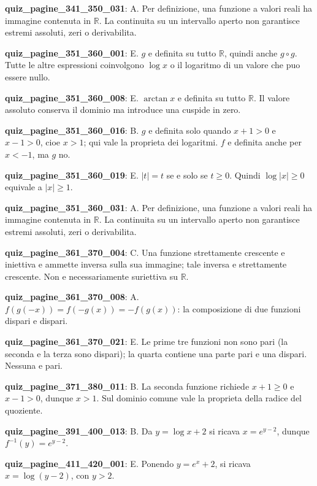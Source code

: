 \documentclass[11pt,a4paper]{article}
\newcounter{quiz}
\begin{document}
\noindent\textbf{quiz\_pagine\_341\_350\_031}: A. Per definizione, una funzione a valori reali ha immagine contenuta in $\mathbb R$. La continuita su un intervallo aperto non garantisce estremi assoluti, zeri o derivabilita.\par\medskip
\noindent\textbf{quiz\_pagine\_351\_360\_001}: E. $g$ e definita su tutto $\mathbb R$, quindi anche $g\circ g$. Tutte le altre espressioni coinvolgono $\log x$ o il logaritmo di un valore che puo essere nullo.\par\medskip
\noindent\textbf{quiz\_pagine\_351\_360\_008}: E. $\arctan x$ e definita su tutto $\mathbb R$. Il valore assoluto conserva il dominio ma introduce una cuspide in zero.\par\medskip
\noindent\textbf{quiz\_pagine\_351\_360\_016}: B. $g$ e definita solo quando $x+1>0$ e $x-1>0$, cioe $x>1$; qui vale la proprieta dei logaritmi. $f$ e definita anche per $x<-1$, ma $g$ no.\par\medskip
\noindent\textbf{quiz\_pagine\_351\_360\_019}: E. $|t|=t$ se e solo se $t\geq0$. Quindi $\log|x|\geq0$ equivale a $|x|\geq1$.\par\medskip
\noindent\textbf{quiz\_pagine\_351\_360\_031}: A. Per definizione, una funzione a valori reali ha immagine contenuta in $\mathbb R$. La continuita su un intervallo aperto non garantisce estremi assoluti, zeri o derivabilita.\par\medskip
\noindent\textbf{quiz\_pagine\_361\_370\_004}: C. Una funzione strettamente crescente e iniettiva e ammette inversa sulla sua immagine; tale inversa e strettamente crescente. Non e necessariamente suriettiva su $\mathbb R$.\par\medskip
\noindent\textbf{quiz\_pagine\_361\_370\_008}: A. $f(g(-x))=f(-g(x))=-f(g(x))$: la composizione di due funzioni dispari e dispari.\par\medskip
\noindent\textbf{quiz\_pagine\_361\_370\_021}: E. Le prime tre funzioni non sono pari (la seconda e la terza sono dispari); la quarta contiene una parte pari e una dispari. Nessuna e pari.\par\medskip
\noindent\textbf{quiz\_pagine\_371\_380\_011}: B. La seconda funzione richiede $x+1\geq0$ e $x-1>0$, dunque $x>1$. Sul dominio comune vale la proprieta della radice del quoziente.\par\medskip
\noindent\textbf{quiz\_pagine\_391\_400\_013}: B. Da $y=\log x+2$ si ricava $x=e^{y-2}$, dunque $f^{-1}(y)=e^{y-2}$.\par\medskip
\noindent\textbf{quiz\_pagine\_411\_420\_001}: E. Ponendo $y=e^x+2$, si ricava $x=\log(y-2)$, con $y>2$.\par\medskip
\end{document}
